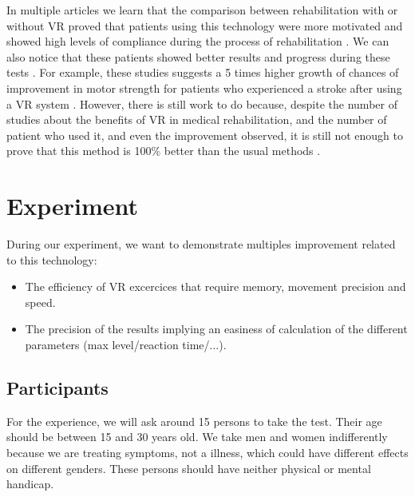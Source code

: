 \documentclass[12pt, openany, twocolumn]{article}
\begin{document}
In multiple articles we learn that the comparison between rehabilitation with or without VR proved that patients using this technology were more motivated and showed high levels of compliance during the process of rehabilitation \cite{sampaioDoesVirtualRealitybased2016, chenProgressSensorimotorRehabilitative2014}.
We can also notice that these patients showed better results and progress during these tests \cite{corbettaRehabilitationThatIncorporates2015, saposnikEffectivenessVirtualReality2010, chenProgressSensorimotorRehabilitative2014, saposnikgustavoVirtualRealityStroke2011}.
For example, these studies suggests a 5 times higher growth of chances of improvement in motor strength for patients who experienced a stroke after using a VR system \cite{saposnikgustavoVirtualRealityStroke2011}.
However, there is still work to do because, despite the number of studies about the benefits of VR in medical rehabilitation, and the number of patient who used it, and even the improvement observed, it is still not enough to prove that this method is 100\% better than the usual methods \cite{saposnikEffectivenessVirtualReality2010, saposnikgustavoVirtualRealityStroke2011, luque-morenoDecadeProgressUsing2015}.

\section{Experiment}

During our experiment, we want to demonstrate multiples improvement related to this technology:

\begin{itemize}
    \item The efficiency of VR excercices that require memory, movement precision and speed.
    \item The precision of the results implying an easiness of calculation of the different parameters (max level/reaction time/...).
\end{itemize}

    \subsection{Participants}

    For the experience, we will ask around 15 persons to take the test. 
    Their age should be between 15 and 30 years old. 
    We take men and women indifferently because we are treating symptoms, not a illness, which could have different effects on different genders.
    These persons should have neither physical or mental handicap. 
    \\
\end{document}
